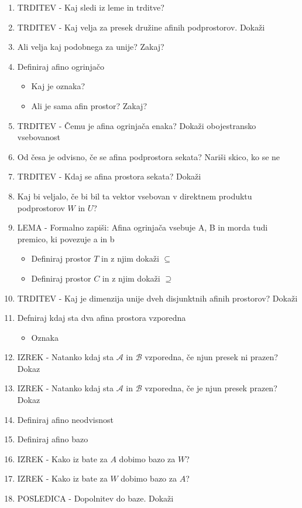 \documentclass{article}
\begin{document}
\begin{enumerate}
\begin{itemize}
        \end{itemize}
        \item TRDITEV - Kaj sledi iz leme in trditve?
        \item TRDITEV - Kaj velja za presek družine afinih podprostorov. Dokaži
        \item Ali velja kaj podobnega za unije? Zakaj?
        \item Definiraj afino ogrinjačo
        \begin{itemize}
            \item Kaj je oznaka?
            \item Ali je sama afin prostor? Zakaj?
        \end{itemize}
        \item TRDITEV - Čemu je afina ogrinjača enaka? Dokaži obojestransko vsebovanost
        \item Od česa je odvisno, če se afina podprostora sekata? Nariši skico, ko se ne
        \item TRDITEV - Kdaj se afina prostora sekata? Dokaži
        \item Kaj bi veljalo, če bi bil ta vektor vsebovan v direktnem produktu podprostorov $W$ in $U$?
        \item LEMA - Formalno zapiši: Afina ogrinjača vsebuje A, B in morda tudi premico, ki povezuje a in b
        \begin{itemize}
            \item Definiraj prostor $T$ in z njim dokaži $\subseteq$
            \item Definiraj prostor $C$ in z njim dokaži $\supseteq$ 
        \end{itemize}
        \item TRDITEV - Kaj je dimenzija unije dveh disjunktnih afinih prostorov? Dokaži
        \item Defniraj kdaj sta dva afina prostora vzporedna
        \begin{itemize}
            \item Oznaka
        \end{itemize}
        \item IZREK - Natanko kdaj sta $\mathcal{A}$ in $\mathcal{B}$ vzporedna, če njun presek ni prazen? Dokaz
        \item IZREK - Natanko kdaj sta $\mathcal{A}$ in $\mathcal{B}$ vzporedna, če je njun presek prazen? Dokaz
        \item Definiraj afino neodvisnost
        \item Definiraj afino bazo
        \item IZREK - Kako iz bate za $A$ dobimo bazo za $W$?
        \item IZREK - Kako iz bate za $W$ dobimo bazo za $A$?
        \item POSLEDICA - Dopolnitev do baze. Dokaži
    \end{enumerate}
\end{document}
